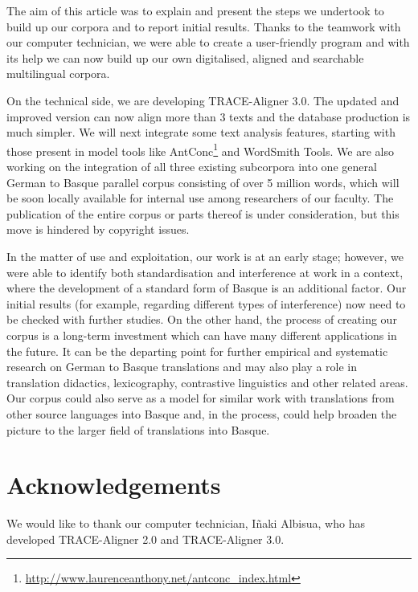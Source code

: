 \documentclass[output=paper]{LSP/langsci}
\begin{document}
The aim of this article was to explain and present the steps we undertook to build up our corpora and to report initial results. Thanks to the teamwork with our computer technician, we were able to create a user-friendly program and with its help we can now build up our own digitalised, aligned and searchable multilingual corpora.

On the technical side, we are developing TRACE-Aligner 3.0. The updated and improved version can now align more than 3 texts and the database production is much simpler. We will next integrate some text analysis features, starting with those present in model tools like AntConc\footnote{\url{http://www.laurenceanthony.net/antconc_index.html}} and WordSmith Tools. We are also working on the integration of all three existing subcorpora into one general German to Basque parallel corpus consisting of over 5 million words, which will be soon locally available for internal use among researchers of our faculty. The publication of the entire corpus or parts thereof is under consideration, but this move is hindered by copyright issues.

In the matter of use and exploitation, our work is at an early stage; however, we were able to identify both standardisation and interference at work in a context, where the development of a standard form of Basque is an additional factor. Our initial results (for example, regarding different types of interference) now need to be checked with further studies. On the other hand, the process of creating our corpus is a long-term investment which can have many different applications in the future. It can be the departing point for further empirical and systematic research on German to Basque translations and may also play a role in translation didactics, lexicography, contrastive linguistics and other related areas. Our corpus could also serve as a model for similar work with translations from other source languages into Basque and, in the process, could help broaden the picture to the larger field of translations into Basque.


\section*{Acknowledgements}

We would like to thank our computer technician, Iñaki Albisua, who has developed TRACE-Aligner 2.0 and TRACE-Aligner 3.0.

\printbibliography[heading=subbibliography,notkeyword=this]
\end{document}
